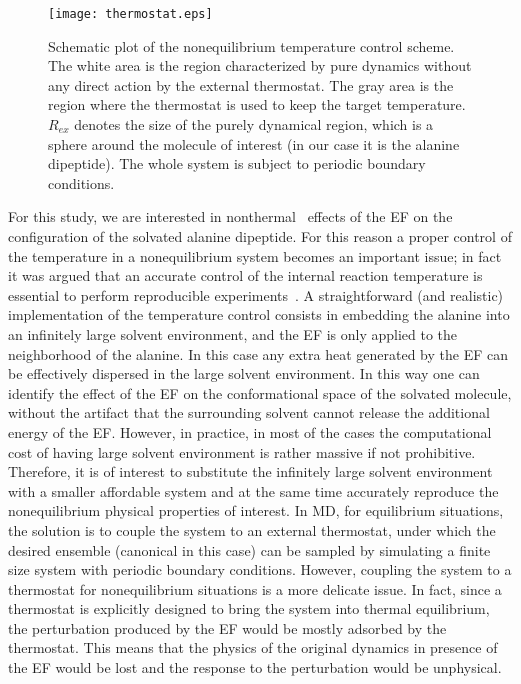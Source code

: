 \documentclass[journal=jctcce,manuscript=manuscript]{achemso}
\begin{document}
\begin{figure}
  \centering
  \texttt{[image: thermostat.eps]}
  \caption{Schematic plot of the nonequilibrium temperature control scheme.
    The white area is the region characterized by pure dynamics without any direct action by the external thermostat.
    The gray area is the region where the thermostat is used to keep the target temperature.
    $R_{ex}$ denotes the size of the purely dynamical region, which
    is a sphere around the molecule of interest (in our case it is the alanine
    dipeptide).
    The whole system is subject to periodic boundary conditions. }
  \label{fig:tmp2}
\end{figure}
For this study, we are interested in 
nonthermal~\cite{delaHoz2005microwaves} effects of the EF
on the configuration of the solvated alanine dipeptide.
For this reason a proper control of the temperature in a nonequilibrium system
becomes an important issue; in fact it was argued that  an
accurate control of the internal reaction temperature is essential to
perform reproducible experiments~\cite{damm2012can}.
A straightforward (and realistic) implementation of the temperature control consists in 
embedding the alanine into an infinitely large solvent environment, and 
the EF is only applied to the neighborhood of the alanine. In this case
any extra heat generated by the EF can be effectively
dispersed in the large solvent environment.
In this way one can identify the effect of the EF on the conformational space of the solvated molecule,
without the artifact that the surrounding solvent cannot release the additional energy of the EF.
However, in practice, in most of the cases the computational cost of having large solvent environment is rather massive if not prohibitive.
Therefore, it is of interest to substitute the infinitely large
solvent environment with a smaller affordable system and at the same time accurately reproduce the nonequilibrium
physical properties of interest.
In MD, for equilibrium situations, the solution is to couple
the system to an external thermostat, under which the desired ensemble
(canonical in this case) can be
sampled by simulating a finite size system with periodic boundary
conditions.
However, coupling the system to a thermostat for nonequilibrium situations is a more delicate issue.
In fact, since a thermostat is explicitly designed to bring the system into
thermal equilibrium,
the perturbation produced by the EF would be mostly adsorbed by the thermostat. This means that the physics of the original dynamics in presence of the EF
would be lost and the response to the perturbation would be unphysical.
\end{document}

